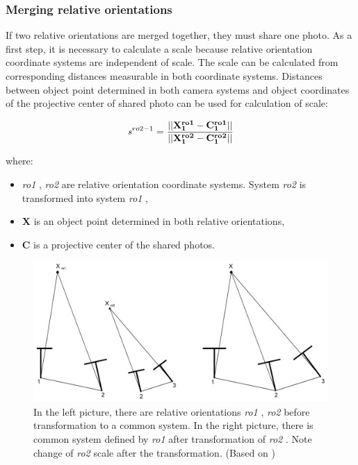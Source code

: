 \documentclass[a4paper,12pt]{article}
\newcommand{\evect}[1]{%
{\bf #1}%
}
\newcommand{\escal}[1]{%
{\it #1}%
}
\newcommand{\term}[1]{%
{\it #1}%
}
\begin{document}
\subsubsection{Merging relative orientations}
\label{sec:ess_chain}


If two relative orientations are merged together, they must share one photo.
As a first step, it is necessary to calculate a scale \cite{pietzsch2001robot}
because relative orientation coordinate systems are independent of scale.
The scale can be calculated from corresponding distances measurable in  both coordinate systems. 
Distances between object point determined in both camera systems and object coordinates of the projective center of shared photo 
can be used for calculation of scale:

\begin{equation}
\escal{s}^{ro2-1} = \frac{||\mathbf{\evect{X}^{ro1}_{1} - \evect{C^{ro1}_{1}}}||}
	                {||\mathbf{\evect{X}^{ro2}_{1} - \evect{C^{ro2}_{1}}}||}
\end{equation}

\noindent where:
\begin{itemize}
\item \term{ro1}, \term{ro2} are relative orientation coordinate systems. 
System \term{ro2} is transformed into system \term{ro1},
\item \evect{X} is an object point determined in both relative orientations,
\item \evect{C} is a projective center of the shared photos.
\end{itemize}

\begin{figure}[h]
    \centering
    \includegraphics[scale=0.25]{figures/rel_or.png}
    \caption{In the left picture, there are relative orientations \term{ro1}, \term{ro2} before transformation 
    to a common system. 
    In the right picture, there is common system defined by \term{ro1} after transformation of \term{ro2}. 
    Note change of \term{ro2} scale after the transformation. (Based on \cite[p. 20]{pietzsch2001robot})}
    \label{fig:rel_or_amb}
\end{figure}
\end{document}
